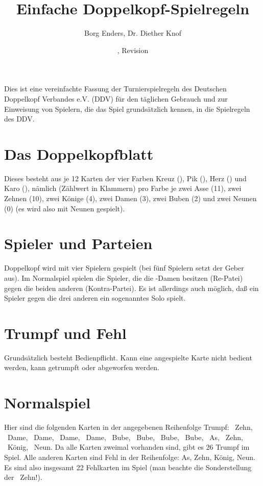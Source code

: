 \documentclass[12pt]{scrartcl}
\title{Einfache Doppelkopf-Spielregeln}
\author{Borg Enders, Dr. Diether Knof}
\date{\svnInfoLongDate, Revision \svnInfoRevision}
\begin{document}
\maketitle

\noindent
Dies ist eine vereinfachte Fassung der Turnierspielregeln des Deutschen Doppelkopf Verbandes e.V. (DDV) für den täglichen Gebrauch und zur Einweisung von Spielern, die das Spiel grundsätzlich kennen, in die Spielregeln des DDV.

\tableofcontents

\section{Das Doppelkopfblatt}
Dieses besteht aus je 12 Karten der vier Farben Kreuz (\Kreuz), Pik (\Pik), Herz (\Herz) und Karo (\Karo), nämlich (Zählwert in Klammern) pro Farbe je zwei Asse (11), zwei Zehnen (10), zwei Könige (4), zwei Damen (3), zwei
Buben (2) und zwei Neunen (0) (es wird also mit Neunen gespielt).

\section{Spieler und Parteien}
Doppelkopf wird mit vier Spielern gespielt (bei fünf Spielern setzt der Geber aus). Im Normalspiel spielen die Spieler, die die \Kreuz-Damen besitzen (Re-Patei) gegen die beiden anderen (Kontra-Partei). Es ist allerdings auch möglich, daß ein Spieler gegen die drei anderen ein sogenanntes Solo spielt.

\section{Trumpf und Fehl}
Grundsätzlich besteht Bedienpflicht. Kann eine angespielte Karte nicht bedient werden, kann getrumpft oder abgeworfen werden.

\section{Normalspiel}
Hier sind die folgenden Karten in der angegebenen Reihenfolge Trumpf: \Herz\ Zehn, \Kreuz\ Dame, \Pik\ Dame, \Herz\ Dame, \Karo\ Dame, \Kreuz\ Bube, \Pik\ Bube, \Herz\ Bube, \Karo\ Bube, \Karo\ As, \Karo\ Zehn, \Karo\ König, \Karo\ Neun. Da alle Karten zweimal vorhanden sind, gibt es 26 Trumpf im Spiel. Alle anderen Karten sind Fehl in der Reihenfolge: As, Zehn, König, Neun. Es sind also insgesamt 22 Fehlkarten im Spiel (man beachte die Sonderstellung der \Herz\ Zehn!).
\end{document}
